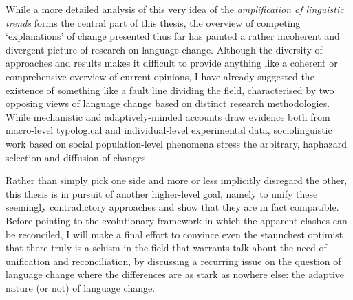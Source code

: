 


While a more detailed analysis of this very idea of the \emph{amplification of linguistic trends} forms the central part of this thesis, the overview of competing `explanations' of change presented thus far has painted a rather incoherent and divergent picture of research on language change.
Although the diversity of approaches and results makes it difficult to provide anything like a coherent or comprehensive overview of current opinions, I have already suggested the existence of something like a fault line dividing the field, characterised by two opposing views of language change based on distinct research methodologies.
While mechanistic and adaptively-minded accounts draw evidence both from macro-level typological and individual-level experimental data, sociolinguistic work based on social population-level phenomena stress the arbitrary, haphazard selection and diffusion of changes.

Rather than simply pick one side and more or less implicitly disregard the other, this thesis is in pursuit of another higher-level goal, namely to unify these seemingly contradictory approaches and show that they are in fact compatible.
Before pointing to the evolutionary framework in which the apparent clashes can be reconciled, I will make a final effort to convince even the staunchest optimist that there truly is a schism in the field that warrants talk about the need of unification and reconciliation, by discussing a recurring issue on the question of language change where the differences are as stark as nowhere else: the adaptive nature (or not) of language change.
